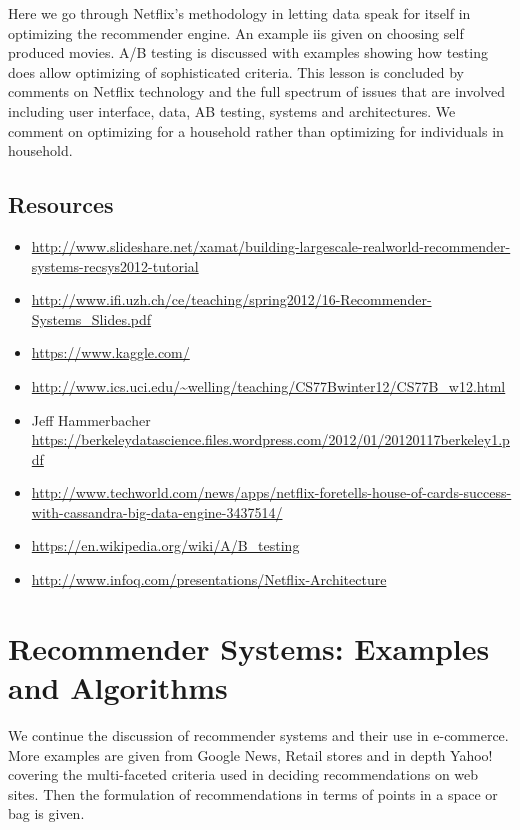 Here we go through Netflix's methodology in letting data speak for
itself in optimizing the recommender engine. An example iis given on
choosing self produced movies. A/B testing is discussed with examples
showing how testing does allow optimizing of sophisticated criteria.
This lesson is concluded by comments on Netflix technology and the full
spectrum of issues that are involved including user interface, data, AB
testing, systems and architectures. We comment on optimizing for a
household rather than optimizing for individuals in household.


\subsection{Resources}\label{resources}

\begin{itemize}

\item
  \url{http://www.slideshare.net/xamat/building-largescale-realworld-recommender-systems-recsys2012-tutorial}
\item
  \url{http://www.ifi.uzh.ch/ce/teaching/spring2012/16-Recommender-Systems_Slides.pdf}
\item
  \url{https://www.kaggle.com/}
\item
  \url{http://www.ics.uci.edu/~welling/teaching/CS77Bwinter12/CS77B_w12.html}
\item
  Jeff Hammerbacher
  \url{https://berkeleydatascience.files.wordpress.com/2012/01/20120117berkeley1.pdf}
\item
  \url{http://www.techworld.com/news/apps/netflix-foretells-house-of-cards-success-with-cassandra-big-data-engine-3437514/}
\item
  \url{https://en.wikipedia.org/wiki/A/B_testing}
\item
  \url{http://www.infoq.com/presentations/Netflix-Architecture}
\end{itemize}

\section{Recommender Systems: Examples and
Algorithms}\label{recommender-systems-examples-and-algorithms}

We continue the discussion of recommender systems and their use in
e-commerce. More examples are given from Google News, Retail stores and
in depth Yahoo! covering the multi-faceted criteria used in deciding
recommendations on web sites. Then the formulation of recommendations in
terms of points in a space or bag is given.

